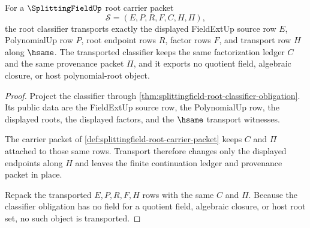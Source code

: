 \begin{theorem}
\label{thm:splittingfield-root-classifier-transport}
For a $\SplittingFieldUp$ root carrier packet
$$
\mathcal{S}=(E,P,R,F,C,H,\Pi),
$$
the root classifier transports exactly the displayed FieldExtUp source row
$E$, PolynomialUp row $P$, root endpoint rows $R$, factor rows $F$, and
transport row $H$ along $\hsame$. The transported classifier keeps the same
factorization ledger $C$ and the same provenance packet $\Pi$, and it exports
no quotient field, algebraic closure, or host polynomial-root object.
\end{theorem}
\begin{proof}
Project the classifier through
\autoref{thm:splittingfield-root-classifier-obligation}. Its public data are
the FieldExtUp source row, the PolynomialUp row, the displayed roots, the
displayed factors, and the $\hsame$ transport witnesses.

The carrier packet of
\autoref{def:splittingfield-root-carrier-packet} keeps $C$ and $\Pi$ attached
to those same rows. Transport therefore changes only the displayed endpoints
along $H$ and leaves the finite continuation ledger and provenance packet in
place.

Repack the transported $E,P,R,F,H$ rows with the same $C$ and $\Pi$. Because
the classifier obligation has no field for a quotient field, algebraic
closure, or host root set, no such object is transported.
\end{proof}

